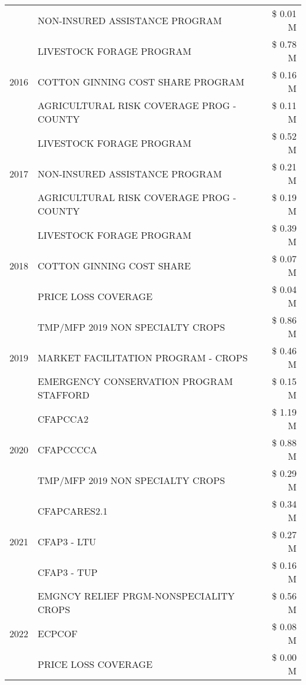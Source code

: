 \begin{tabular}{llr}
 & NON-INSURED ASSISTANCE PROGRAM & \$ 0.01 M \\
\cline{1-3}
\multirow[t]{3}{*}{2016} & LIVESTOCK FORAGE PROGRAM & \$ 0.78 M \\
 & COTTON GINNING COST SHARE PROGRAM & \$ 0.16 M \\
 & AGRICULTURAL RISK COVERAGE PROG - COUNTY & \$ 0.11 M \\
\cline{1-3}
\multirow[t]{3}{*}{2017} & LIVESTOCK FORAGE PROGRAM & \$ 0.52 M \\
 & NON-INSURED ASSISTANCE PROGRAM & \$ 0.21 M \\
 & AGRICULTURAL RISK COVERAGE PROG - COUNTY & \$ 0.19 M \\
\cline{1-3}
\multirow[t]{3}{*}{2018} & LIVESTOCK FORAGE PROGRAM & \$ 0.39 M \\
 & COTTON GINNING COST SHARE & \$ 0.07 M \\
 & PRICE LOSS COVERAGE & \$ 0.04 M \\
\cline{1-3}
\multirow[t]{3}{*}{2019} & TMP/MFP 2019 NON SPECIALTY CROPS & \$ 0.86 M \\
 & MARKET FACILITATION PROGRAM - CROPS & \$ 0.46 M \\
 & EMERGENCY CONSERVATION PROGRAM STAFFORD & \$ 0.15 M \\
\cline{1-3}
\multirow[t]{3}{*}{2020} & CFAPCCA2 & \$ 1.19 M \\
 & CFAPCCCCA & \$ 0.88 M \\
 & TMP/MFP 2019 NON SPECIALTY CROPS & \$ 0.29 M \\
\cline{1-3}
\multirow[t]{3}{*}{2021} & CFAPCARES2.1 & \$ 0.34 M \\
 & CFAP3 - LTU & \$ 0.27 M \\
 & CFAP3 - TUP & \$ 0.16 M \\
\cline{1-3}
\multirow[t]{3}{*}{2022} & EMGNCY RELIEF PRGM-NONSPECIALITY CROPS & \$ 0.56 M \\
 & ECPCOF & \$ 0.08 M \\
 & PRICE LOSS COVERAGE & \$ 0.00 M \\
\cline{1-3}
\bottomrule
\end{tabular}
